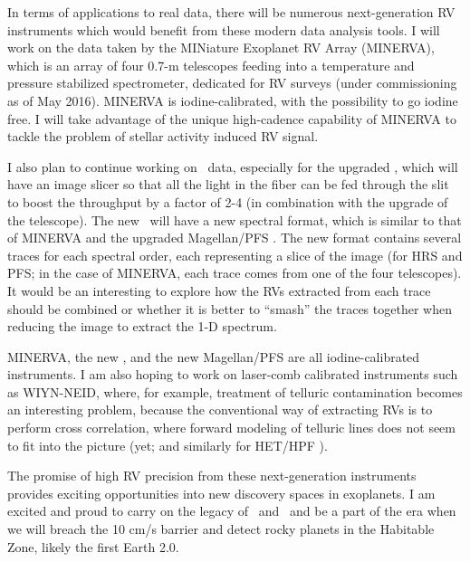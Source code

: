 In terms of applications to real data, there will be numerous
next-generation RV instruments which would benefit from these modern
data analysis tools. I will work on the data taken by the MINiature
Exoplanet RV Array (MINERVA), which is an array of four 0.7-m
telescopes feeding into a temperature and pressure stabilized
spectrometer, dedicated for RV surveys (under commissioning as of May
2016). MINERVA is iodine-calibrated, with the possibility to go iodine
free. I will take advantage of the unique high-cadence capability of
MINERVA to tackle the problem of stellar activity induced RV signal. 

I also plan to continue working on \het\ data, especially for the
upgraded \het, which will have an image slicer so that all the light
in the fiber can be fed through the slit to boost the throughput by a
factor of 2-4 (in combination with the upgrade of the telescope). The
new \het\ will have a new spectral format, which is similar to that of
MINERVA and the upgraded Magellan/PFS \citep{2010SPIE.7735E..53C}. The
new format contains several traces for each spectral order, each
representing a slice of the image (for HRS and PFS; in the case of
MINERVA, each trace comes from one of the four telescopes). It would
be an interesting to explore how the RVs extracted from each trace
should be combined or whether it is better to ``smash'' the traces
together when reducing the image to extract the 1-D spectrum.

MINERVA, the new \het, and the new Magellan/PFS are all
iodine-calibrated instruments. I am also hoping to work on laser-comb
calibrated instruments such as WIYN-NEID, where, for example,
treatment of telluric contamination becomes an interesting problem,
because the conventional way of extracting RVs is to perform cross
correlation, where forward modeling of telluric lines does not seem to
fit into the picture (yet; and similarly for HET/HPF
\citep{2012SPIE.8446E..1SM}).   

The promise of high RV precision from these next-generation
instruments provides exciting opportunities into new discovery spaces
in exoplanets. I am excited and proud to carry on the legacy of \het\
and \keck\ and be a part of the era when we will breach the 10 cm/s
barrier and detect rocky planets in the Habitable Zone, likely the
first Earth 2.0.

